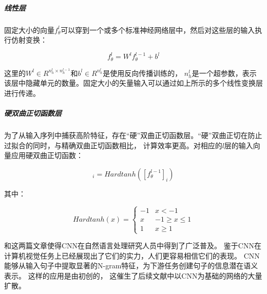 \subparagraph{线性层}

固定大小的向量$f^{l}_{\theta}$可以穿到一个或多个标准神经网络层中，然后对这些层的输入执行仿射变换：

\begin{equation}
	f^{l}_{\theta} 
	= W^l f^{l - 1}_{\theta} + b^l
\end{equation}

这里的$W^l \in R^{ n^l_h \times n^{l - 1}_h}$和$b^l \in R^{n^l_h}$是使用反向传播训练的，
$n^l_h$是一个超参数，表示该层中隐藏单元的数量。固定大小的矢量输入可以通过如上所示的多个线性变换层进行传递。

\subparagraph{硬双曲正切函数层}

为了从输入序列中捕获高阶特征，存在“硬”双曲正切函数层。“硬”双曲正切在防止过拟合的同时，与精确双曲正切函数相比，
计算效率更高。对相应的$l$层的输入向量应用硬双曲正切函数：

\begin{equation}
	[f^{l}_{\theta}]_i 
	= Hard tanh(\left[f^{l - 1}_{\theta}\right]_i)
\end{equation}

其中：

\begin{equation}
	Hard tanh(x)
    = \begin{cases}
        -1 & x < -1 \\
        x & -1 \geq x \leq 1 \\
        1 & x \geq 1
    \end{cases}
\end{equation}




\parencite{collobert2008unified}和\parencite{collobert2011natural}这两篇文章使得CNN在自然语言处理研究人员中得到了广泛普及。
鉴于CNN在计算机视觉任务上已经展现出了它们的实力，人们更容易相信它们的表现。
CNN能够从输入句子中提取显著的N-gram特征，为下游任务创建句子的信息潜在语义表示。
这样的应用是由\parencite{collobert2011natural, kim2016character, kalchbrenner2014convolutional}初创的，
这催生了后续文献中以CNN为基础的网络的大量扩散。

